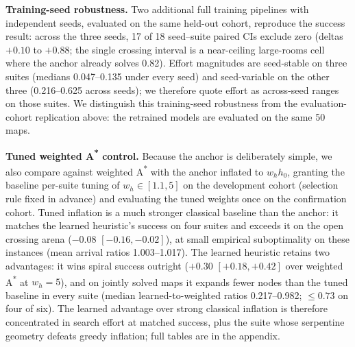 \documentclass[letterpaper]{article} %
\begin{document}
\textbf{Training-seed robustness.} Two additional full training pipelines with independent seeds, evaluated on the same held-out cohort, reproduce the success result: across the three seeds, 17 of 18 seed--suite paired CIs exclude zero (deltas $+0.10$ to $+0.88$; the single crossing interval is a near-ceiling large-rooms cell where the anchor already solves 0.82). Effort magnitudes are seed-stable on three suites (medians 0.047--0.135 under every seed) and seed-variable on the other three (0.216--0.625 across seeds); we therefore quote effort as across-seed ranges on those suites. We distinguish this training-seed robustness from the evaluation-cohort replication above: the retrained models are evaluated on the same 50 maps.

\textbf{Tuned weighted A\textsuperscript{*} control.} Because the anchor is deliberately simple, we also compare against weighted A\textsuperscript{*} with the anchor inflated to $w_h h_0$, granting the baseline per-suite tuning of $w_h \in [1.1, 5]$ on the development cohort (selection rule fixed in advance) and evaluating the tuned weights once on the confirmation cohort. Tuned inflation is a much stronger classical baseline than the anchor: it matches the learned heuristic's success on four suites and exceeds it on the open crossing arena ($-0.08$ $[-0.16,-0.02]$), at small empirical suboptimality on these instances (mean arrival ratios 1.003--1.017). The learned heuristic retains two advantages: it wins spiral success outright ($+0.30$ $[+0.18,+0.42]$ over weighted A\textsuperscript{*} at $w_h{=}5$), and on jointly solved maps it expands fewer nodes than the tuned baseline in every suite (median learned-to-weighted ratios 0.217--0.982; $\leq 0.73$ on four of six). The learned advantage over strong classical inflation is therefore concentrated in search effort at matched success, plus the suite whose serpentine geometry defeats greedy inflation; full tables are in the appendix.
\end{document}
